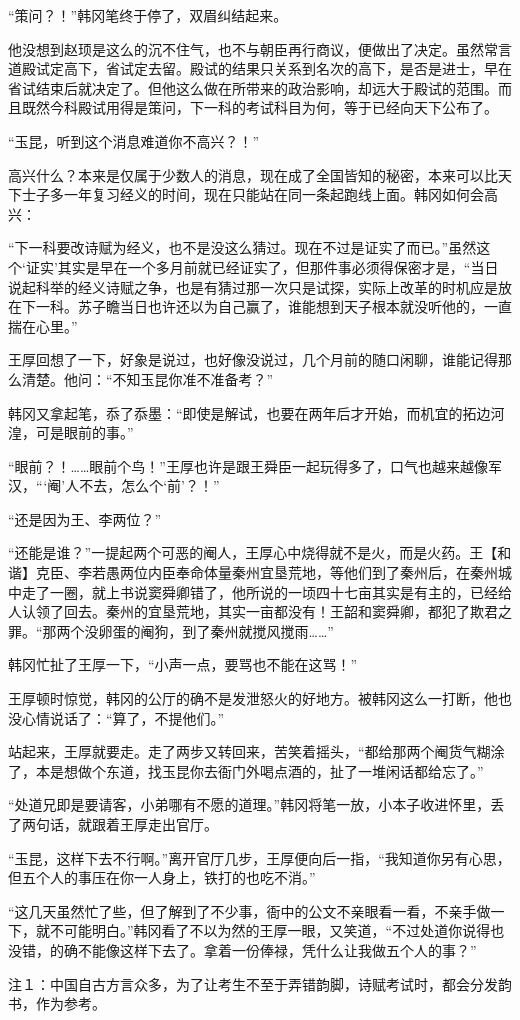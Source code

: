 “策问？！”韩冈笔终于停了，双眉纠结起来。

他没想到赵顼是这么的沉不住气，也不与朝臣再行商议，便做出了决定。虽然常言道殿试定高下，省试定去留。殿试的结果只关系到名次的高下，是否是进士，早在省试结束后就决定了。但他这么做在所带来的政治影响，却远大于殿试的范围。而且既然今科殿试用得是策问，下一科的考试科目为何，等于已经向天下公布了。

“玉昆，听到这个消息难道你不高兴？！”

高兴什么？本来是仅属于少数人的消息，现在成了全国皆知的秘密，本来可以比天下士子多一年复习经义的时间，现在只能站在同一条起跑线上面。韩冈如何会高兴：

“下一科要改诗赋为经义，也不是没这么猜过。现在不过是证实了而已。”虽然这个‘证实’其实是早在一个多月前就已经证实了，但那件事必须得保密才是，“当日说起科举的经义诗赋之争，也是有猜过那一次只是试探，实际上改革的时机应是放在下一科。苏子瞻当日也许还以为自己赢了，谁能想到天子根本就没听他的，一直揣在心里。”

王厚回想了一下，好象是说过，也好像没说过，几个月前的随口闲聊，谁能记得那么清楚。他问：“不知玉昆你准不准备考？”

韩冈又拿起笔，忝了忝墨：“即使是解试，也要在两年后才开始，而机宜的拓边河湟，可是眼前的事。”

“眼前？！……眼前个鸟！”王厚也许是跟王舜臣一起玩得多了，口气也越来越像军汉，“‘阉’人不去，怎么个‘前’？！”

“还是因为王、李两位？”

“还能是谁？”一提起两个可恶的阉人，王厚心中烧得就不是火，而是火药。王【和谐】克臣、李若愚两位内臣奉命体量秦州宜垦荒地，等他们到了秦州后，在秦州城中走了一圈，就上书说窦舜卿错了，他所说的一顷四十七亩其实是有主的，已经给人认领了回去。秦州的宜垦荒地，其实一亩都没有！王韶和窦舜卿，都犯了欺君之罪。“那两个没卵蛋的阉狗，到了秦州就搅风搅雨……”

韩冈忙扯了王厚一下，“小声一点，要骂也不能在这骂！”

王厚顿时惊觉，韩冈的公厅的确不是发泄怒火的好地方。被韩冈这么一打断，他也没心情说话了：“算了，不提他们。”

站起来，王厚就要走。走了两步又转回来，苦笑着摇头，“都给那两个阉货气糊涂了，本是想做个东道，找玉昆你去衙门外喝点酒的，扯了一堆闲话都给忘了。”

“处道兄即是要请客，小弟哪有不愿的道理。”韩冈将笔一放，小本子收进怀里，丢了两句话，就跟着王厚走出官厅。

“玉昆，这样下去不行啊。”离开官厅几步，王厚便向后一指，“我知道你另有心思，但五个人的事压在你一人身上，铁打的也吃不消。”

“这几天虽然忙了些，但了解到了不少事，衙中的公文不亲眼看一看，不亲手做一下，就不可能明白。”韩冈看了不以为然的王厚一眼，又笑道，“不过处道你说得也没错，的确不能像这样下去了。拿着一份俸禄，凭什么让我做五个人的事？”

注１：中国自古方言众多，为了让考生不至于弄错韵脚，诗赋考试时，都会分发韵书，作为参考。

